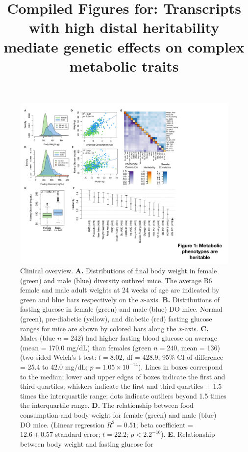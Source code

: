 \documentclass[
]{article}
\title{Compiled Figures for: Transcripts with high distal heritability
mediate genetic effects on complex metabolic traits}
\author{}
\date{\vspace{-2.5em}}
\begin{document}
\maketitle

\begin{figure}[ht!]
\includegraphics[width=\textwidth]{Figures/Fig1_trait_overview.pdf} 
\caption{Clinical overview. \textbf{A.} Distributions of final body 
weight in female (green) and male (blue) diversity outbred mice.
The average B6 female and male adult weights at 24 weeks of 
age are indicated by green and blue bars respectively on the 
$x$-axis. \textbf{B.} Distributions of fasting glucose in female 
(green) and male (blue) DO mice. Normal (green), pre-diabetic
(yellow), and diabetic (red) fasting glucose ranges for mice are 
shown by colored bars along the $x$-axis. \textbf{C.} Males 
(blue $n = 242$) had higher fasting blood glucose on average 
(mean = 170.0 mg/dL) than females (green $n = 240$, 
mean = 136) (two-sided Welch's t test: $t = 8.02$, 
df = 428.9, 95\% CI of difference = 25.4 to 42.0 mg/dL; 
$p = 1.05\times10^{-14}$). Lines in boxes 
correspond to the median; lower and upper edges of 
boxes indicate the first and third quartiles; whiskers 
indicate the first and third quartiles $\pm$ 1.5 times
the interquartile range; dots indicate outliers beyond 1.5 times
the interquartile range. \textbf{D.} The relationship between 
food consumption and body weight for female (green) and 
male (blue) DO mice. (Linear regression 
$R^2 = 0.51$;  beta coefficient = $12.6\pm0.57$ 
standard error; $t = 22.2$; $p < 2.2^{-16}$). \textbf{E.} 
Relationship between body weight and fasting glucose for 
}
\end{figure}
\end{document}
